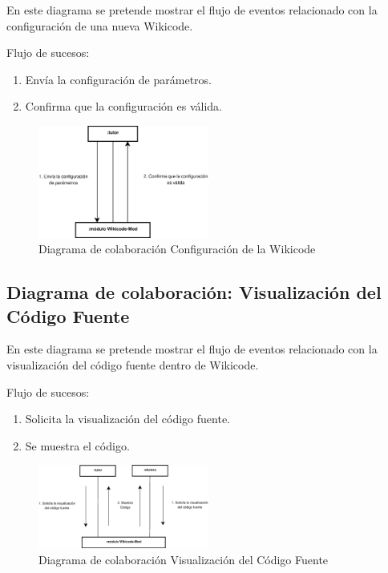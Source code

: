 En este diagrama se pretende mostrar el flujo de eventos relacionado con la configuración de una nueva Wikicode.

Flujo de sucesos:

\begin{enumerate}
	\item Envía la configuración de parámetros.
	\item Confirma que la configuración es válida.
\end{enumerate}

\begin{figure}[h]
	\centering
	\includegraphics[width=0.5\textwidth]{./img/c3-dia-col1.eps}
	\caption{Diagrama de colaboración Configuración de la Wikicode}
\end{figure}

\subsection{Diagrama de colaboración: Visualización del Código Fuente}

En este diagrama se pretende mostrar el flujo de eventos relacionado con la visualización del código fuente dentro de Wikicode.

Flujo de sucesos:

\begin{enumerate}
	\item Solicita la visualización del código fuente.
	\item Se muestra el código.
\end{enumerate}

\begin{figure}[h]
	\centering
	\includegraphics[width=0.5\textwidth]{./img/c3-dia-col2.eps}
	\caption{Diagrama de colaboración Visualización del Código Fuente}
\end{figure}

